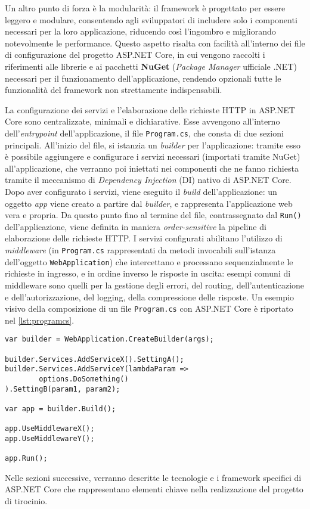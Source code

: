 Un altro punto di forza è la modularità: il framework è progettato per essere leggero e modulare, consentendo agli sviluppatori di includere solo i componenti necessari per la loro applicazione, riducendo così l'ingombro e migliorando notevolmente le performance.
Questo aspetto risalta con facilità all'interno dei file di configurazione del progetto ASP.NET Core, in cui vengono raccolti i riferimenti alle librerie e ai pacchetti \textbf{NuGet} (\emph{Package Manager} ufficiale .NET) necessari per il funzionamento dell'applicazione, rendendo opzionali tutte le funzionalità del framework non strettamente indispensabili.

La configurazione dei servizi e l'elaborazione delle richieste HTTP in ASP.NET Core sono centralizzate, minimali e dichiarative. Esse avvengono all'interno dell'\emph{entrypoint} dell'applicazione, il file \texttt{Program.cs},
che consta di due sezioni principali. All'inizio del file, si istanzia un \emph{builder} per l'applicazione: tramite esso è possibile aggiungere e configurare i servizi necessari (importati tramite NuGet) all'applicazione, che verranno poi iniettati nei componenti che ne fanno richiesta tramite il meccanismo di \emph{Dependency Injection} (DI) nativo di ASP.NET Core.
Dopo aver configurato i servizi, viene eseguito il \emph{build} dell'applicazione: un oggetto \emph{app} viene creato a partire dal \emph{builder}, e rappresenta l'applicazione web vera e propria.
Da questo punto fino al termine del file, contrassegnato dal \texttt{Run()} dell'applicazione, viene definita in maniera \emph{order-sensitive} la pipeline di elaborazione delle richieste HTTP. I servizi configurati abilitano l'utilizzo di \emph{middleware} (in \texttt{Program.cs} rappresentati da metodi invocabili sull'istanza dell'oggetto \texttt{WebApplication}) che intercettano e processano sequenzialmente le richieste in ingresso, e in ordine inverso le risposte in uscita: esempi comuni di middleware sono quelli per la gestione degli errori, del routing, dell'autenticazione e dell'autorizzazione, del logging, della compressione delle risposte.
Un esempio visivo della composizione di un file \texttt{Program.cs} con ASP.NET Core è riportato nel \cref{lst:programcs}.

\begin{lstlisting}[language={[Sharp]C}, caption={[Esempio Program.cs]Esempio di struttura di un file \texttt{Program.cs} in un progetto ASP.NET Core.}, label=lst:programcs]
var builder = WebApplication.CreateBuilder(args);

builder.Services.AddServiceX().SettingA();
builder.Services.AddServiceY(lambdaParam =>
        options.DoSomething()
).SettingB(param1, param2);

var app = builder.Build();

app.UseMiddlewareX();
app.UseMiddlewareY();

app.Run();
\end{lstlisting}
Nelle sezioni successive, verranno descritte le tecnologie e i framework specifici di ASP.NET Core che rappresentano elementi chiave nella realizzazione del progetto di tirocinio.

